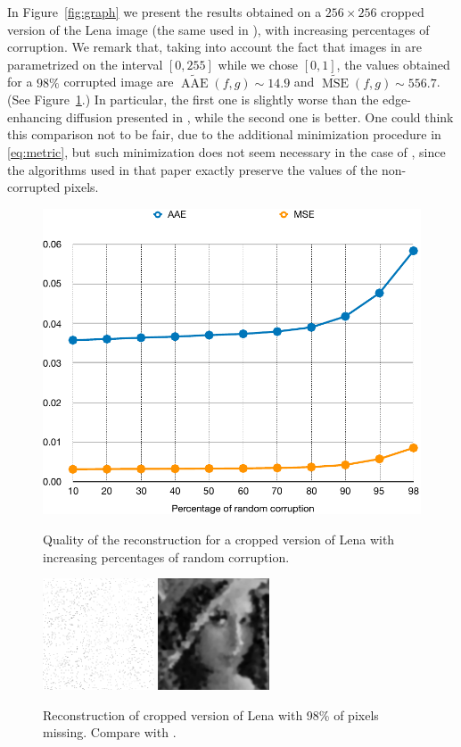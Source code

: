 \documentclass[proc]{edpsmath}
\begin{document}
In Figure~\ref{fig:graph} we present the results obtained on a $256\times 256$ cropped version of the Lena image (the same used in \cite{GWWBBS}), with increasing percentages of corruption. 
We remark that, taking into account the fact that images in \cite{GWWBBS} are parametrized on the interval $[0,255]$ while we chose $[0,1]$, the values obtained for a $98\%$ corrupted image are $\widetilde{\operatorname{AAE}}(f,g)\sim14.9$ and $\widetilde{\operatorname{MSE}}(f,g)\sim556.7$. (See Figure~\ref{fig:lena-AEE}.) In particular, the first one is slightly worse than the edge-enhancing diffusion presented in \cite[Table~1]{GWWBBS}, while the second one is better.
One could think this comparison not to be fair, due to the additional minimization procedure in \eqref{eq:metric}, but such minimization does not seem necessary in the case of \cite{GWWBBS}, since the algorithms used in that paper exactly preserve the values of the non-corrupted pixels.

\begin{figure}
  \begin{minipage}{.55\textwidth}
  \centering
  \includegraphics[width=.7\textwidth]{imgs/graphAEE-MSE}
  \caption{Quality of the reconstruction for a cropped version of Lena with increasing percentages of random corruption.}
  \label{fig:graph}    
  \end{minipage} 
  \begin{minipage}{.43\textwidth}
  \centering
  \includegraphics[height=3.3cm]{imgs/lena-zoom-98-corr}\quad
  \includegraphics[height=3.3cm]{imgs/lena-zoom-98-rec}
  \caption{Reconstruction of cropped version of Lena with 98\% of pixels missing. Compare with \cite[Figure~1]{GWWBBS}.}
  \label{fig:lena-AEE}    
  \end{minipage}
\end{figure}
\end{document}
